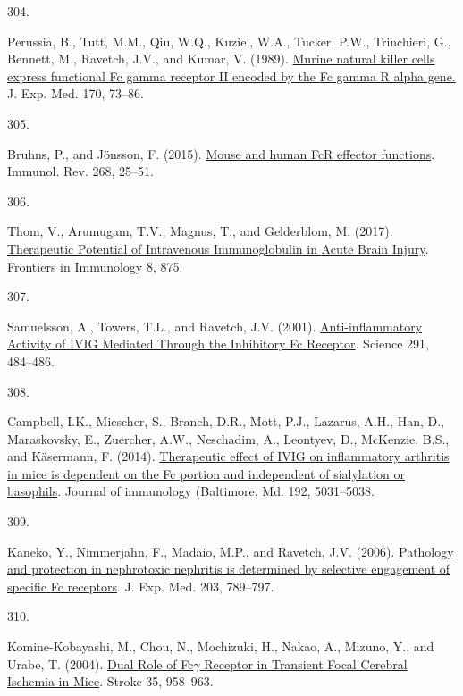 \documentclass[
]{article}
\newlength{\cslhangindent}
\newlength{\csllabelwidth}
\newlength{\cslentryspacingunit} %
\newenvironment{CSLReferences}[2] %
 {%
  \setlength{\parindent}{0pt}
  \ifodd #1
  \let\oldpar\par
  \def\par{\hangindent=\cslhangindent\oldpar}
  \fi
  \setlength{\parskip}{#2\cslentryspacingunit}
 }%
 {}
\newcommand{\CSLLeftMargin}[1]{\parbox[t]{\csllabelwidth}{#1}}
\newcommand{\CSLRightInline}[1]{\parbox[t]{\linewidth - \csllabelwidth}{#1}\break}
\begin{document}
\begin{CSLReferences}{0}{0}
\leavevmode{}%
\CSLLeftMargin{304. }
\CSLRightInline{Perussia, B., Tutt, M.M., Qiu, W.Q., Kuziel, W.A., Tucker, P.W., Trinchieri, G., Bennett, M., Ravetch, J.V., and Kumar, V. (1989). \href{https://doi.org/10.1084/jem.170.1.73}{Murine natural killer cells express functional {Fc} gamma receptor {II} encoded by the {Fc} gamma {R} alpha gene.} J. Exp. Med. 170, 73--86.}

\leavevmode{}%
\CSLLeftMargin{305. }
\CSLRightInline{Bruhns, P., and Jönsson, F. (2015). \href{https://doi.org/10.1111/imr.12350}{Mouse and human {FcR} effector functions}. Immunol. Rev. 268, 25--51.}

\leavevmode{}%
\CSLLeftMargin{306. }
\CSLRightInline{Thom, V., Arumugam, T.V., Magnus, T., and Gelderblom, M. (2017). \href{https://doi.org/10.3389/fimmu.2017.00875}{Therapeutic {Potential} of {Intravenous Immunoglobulin} in {Acute Brain Injury}}. Frontiers in Immunology 8, 875.}

\leavevmode{}%
\CSLLeftMargin{307. }
\CSLRightInline{Samuelsson, A., Towers, T.L., and Ravetch, J.V. (2001). \href{https://doi.org/10.1126/science.291.5503.484}{Anti-inflammatory {Activity} of {IVIG Mediated Through} the {Inhibitory Fc Receptor}}. Science 291, 484--486.}

\leavevmode{}%
\CSLLeftMargin{308. }
\CSLRightInline{Campbell, I.K., Miescher, S., Branch, D.R., Mott, P.J., Lazarus, A.H., Han, D., Maraskovsky, E., Zuercher, A.W., Neschadim, A., Leontyev, D., McKenzie, B.S., and Käsermann, F. (2014). \href{https://doi.org/10.4049/jimmunol.1301611}{Therapeutic effect of {IVIG} on inflammatory arthritis in mice is dependent on the {Fc} portion and independent of sialylation or basophils}. Journal of immunology (Baltimore, Md. 192, 5031--5038.}

\leavevmode{}%
\CSLLeftMargin{309. }
\CSLRightInline{Kaneko, Y., Nimmerjahn, F., Madaio, M.P., and Ravetch, J.V. (2006). \href{https://doi.org/10.1084/jem.20051900}{Pathology and protection in nephrotoxic nephritis is determined by selective engagement of specific {Fc} receptors}. J. Exp. Med. 203, 789--797.}

\leavevmode{}%
\CSLLeftMargin{310. }
\CSLRightInline{Komine-Kobayashi, M., Chou, N., Mochizuki, H., Nakao, A., Mizuno, Y., and Urabe, T. (2004). \href{https://doi.org/10.1161/01.STR.0000120321.30916.8E}{Dual {Role} of {Fc\(\gamma\) Receptor} in {Transient Focal Cerebral Ischemia} in {Mice}}. Stroke 35, 958--963.}

\end{CSLReferences}
\end{document}
